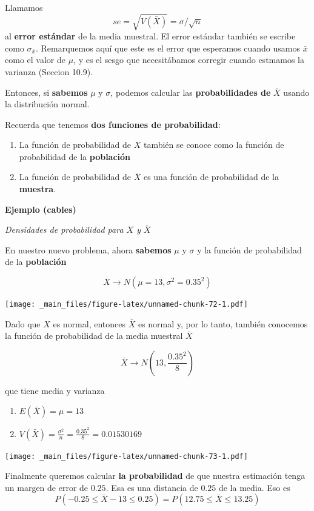 \documentclass[
]{book}
\providecommand{\tightlist}{%
  \setlength{\itemsep}{0pt}\setlength{\parskip}{0pt}}
\begin{document}
Llamamos \[se=\sqrt{V(\bar{X})}=\sigma/\sqrt{n}\] al \textbf{error estándar} de la media muestral. El error estándar también se escribe como \(\sigma_{\bar{x}}\). Remarquemos aquí que este es el error que esperamos cuando usamos \(\bar{x}\) como el valor de \(\mu\), y es el sesgo que necesitábamos corregir cuando estmamos la varianza (Seccion 10.9).

Entonces, si \textbf{sabemos} \(\mu\) y \(\sigma\), podemos calcular las \textbf{probabilidades de} \(\bar{X}\) usando la distribución normal.

Recuerda que tenemos \textbf{dos funciones de probabilidad}:

\begin{enumerate}
\def\labelenumi{\arabic{enumi}.}
\item
  La función de probabilidad de \(X\) también se conoce como la función de probabilidad de la \textbf{población}
\item
  La función de probabilidad de \(\bar{X}\) es una función de probabilidad de la \textbf{muestra}.
\end{enumerate}

\textbf{Ejemplo (cables)}

\emph{Densidades de probabilidad para \(X\) y \(\bar{X}\)}

En nuestro nuevo problema, ahora \textbf{sabemos} \(\mu\) y \(\sigma\) y la función de probabilidad de la \textbf{población}

\[X \rightarrow N(\mu=13, \sigma^2=0.35^2)\]

\texttt{[image: \_main\_files/figure-latex/unnamed-chunk-72-1.pdf]}

Dado que \(X\) es normal, entonces \(\bar{X}\) es normal y, por lo tanto, también conocemos la función de probabilidad de la media muestral \(\bar{X}\)

\[\bar{X} \rightarrow N(13, \frac{0.35^2}{8})\]

que tiene media y varianza

\begin{enumerate}
\def\labelenumi{\arabic{enumi})}
\tightlist
\item
  \(E(\bar{X})=\mu=13\)
\item
  \(V(\bar{X})=\frac{\sigma^2}{n}=\frac{0.35^2}{8}=0.01530169\)
\end{enumerate}

\texttt{[image: \_main\_files/figure-latex/unnamed-chunk-73-1.pdf]}

Finalmente queremos calcular \textbf{la probabilidad} de que nuestra estimación tenga un margen de error de \(0.25\). Esa es una distancia de \(0.25\) de la media. Eso es \[P(-0.25 \leq \bar{X} - 13\leq 0.25)=P(12.75 \leq \bar{X} \leq 13.25)\]
\end{document}
